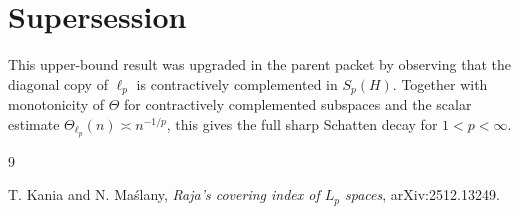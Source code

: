 \documentclass[11pt]{article}
\begin{document}
\section*{Supersession}

This upper-bound result was upgraded in the parent packet by observing that
the diagonal copy of \(\ell_p\) is contractively complemented in \(S_p(H)\).
Together with monotonicity of \(\Theta\) for contractively complemented
subspaces and the scalar estimate
\(\Theta_{\ell_p}(n)\asymp n^{-1/p}\), this gives the full sharp Schatten
decay for \(1<p<\infty\).

\begin{thebibliography}{9}

T. Kania and N. Ma\'slany,
\emph{Raja's covering index of \(L_p\) spaces}, arXiv:2512.13249.

\end{thebibliography}
\end{document}
